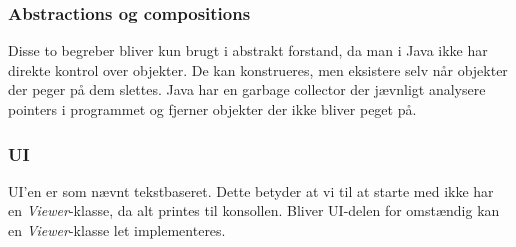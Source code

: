 \subsubsection{Abstractions og compositions}
Disse to begreber bliver kun brugt i abstrakt forstand, da man i Java ikke har direkte kontrol over objekter. De kan konstrueres, men eksistere selv når objekter der peger på dem slettes. Java har en garbage collector der jævnligt analysere pointers i programmet og fjerner objekter der ikke bliver peget på.
\subsubsection{UI}
UI'en er som nævnt tekstbaseret. Dette betyder at vi til at starte med ikke har en \emph{Viewer}-klasse, da alt printes til konsollen. Bliver UI-delen for omstændig kan en \emph{Viewer}-klasse let implementeres.
\newpage